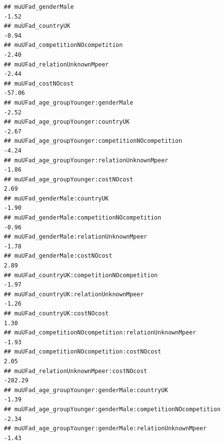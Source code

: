 \documentclass[
]{article}
\begin{document}
\begin{verbatim}
## muUFad_genderMale                                                                                         -1.52
## muUFad_countryUK                                                                                          -0.94
## muUFad_competitionNOcompetition                                                                           -2.40
## muUFad_relationUnknownMpeer                                                                               -2.44
## muUFad_costNOcost                                                                                        -57.06
## muUFad_age_groupYounger:genderMale                                                                        -2.52
## muUFad_age_groupYounger:countryUK                                                                         -2.67
## muUFad_age_groupYounger:competitionNOcompetition                                                          -4.24
## muUFad_age_groupYounger:relationUnknownMpeer                                                              -1.86
## muUFad_age_groupYounger:costNOcost                                                                         2.69
## muUFad_genderMale:countryUK                                                                               -1.90
## muUFad_genderMale:competitionNOcompetition                                                                -0.96
## muUFad_genderMale:relationUnknownMpeer                                                                    -1.78
## muUFad_genderMale:costNOcost                                                                               2.89
## muUFad_countryUK:competitionNOcompetition                                                                 -1.97
## muUFad_countryUK:relationUnknownMpeer                                                                     -1.26
## muUFad_countryUK:costNOcost                                                                                1.30
## muUFad_competitionNOcompetition:relationUnknownMpeer                                                      -1.93
## muUFad_competitionNOcompetition:costNOcost                                                                 2.05
## muUFad_relationUnknownMpeer:costNOcost                                                                  -282.29
## muUFad_age_groupYounger:genderMale:countryUK                                                              -1.39
## muUFad_age_groupYounger:genderMale:competitionNOcompetition                                               -2.34
## muUFad_age_groupYounger:genderMale:relationUnknownMpeer                                                   -1.43

\end{verbatim}
\end{document}
